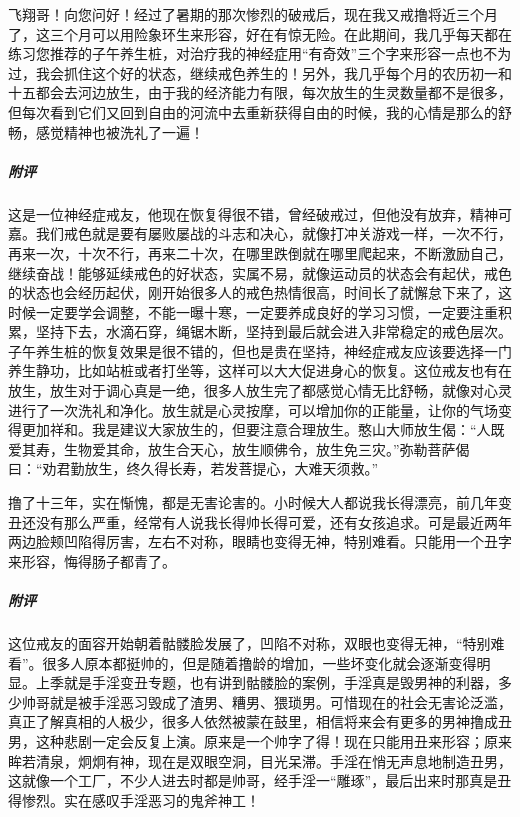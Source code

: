 \begin{case}
    飞翔哥！向您问好！经过了暑期的那次惨烈的破戒后，现在我又戒撸将近三个月了，这三个月可以用险象环生来形容，好在有惊无险。在此期间，我几乎每天都在练习您推荐的子午养生桩，对治疗我的神经症用“有奇效”三个字来形容一点也不为过，我会抓住这个好的状态，继续戒色养生的！另外，我几乎每个月的农历初一和十五都会去河边放生，由于我的经济能力有限，每次放生的生灵数量都不是很多，但每次看到它们又回到自由的河流中去重新获得自由的时候，我的心情是那么的舒畅，感觉精神也被洗礼了一遍！
    \subparagraph{附评} 这是一位神经症戒友，他现在恢复得很不错，曾经破戒过，但他没有放弃，精神可嘉。我们戒色就是要有屡败屡战的斗志和决心，就像打冲关游戏一样，一次不行，再来一次，十次不行，再来二十次，在哪里跌倒就在哪里爬起来，不断激励自己，继续奋战！能够延续戒色的好状态，实属不易，就像运动员的状态会有起伏，戒色的状态也会经历起伏，刚开始很多人的戒色热情很高，时间长了就懈怠下来了，这时候一定要学会调整，不能一曝十寒，一定要养成良好的学习习惯，一定要注重积累，坚持下去，水滴石穿，绳锯木断，坚持到最后就会进入非常稳定的戒色层次。子午养生桩的恢复效果是很不错的，但也是贵在坚持，神经症戒友应该要选择一门养生静功，比如站桩或者打坐等，这样可以大大促进身心的恢复。这位戒友也有在放生，放生对于调心真是一绝，很多人放生完了都感觉心情无比舒畅，就像对心灵进行了一次洗礼和净化。放生就是心灵按摩，可以增加你的正能量，让你的气场变得更加祥和。我是建议大家放生的，但要注意合理放生。憨山大师放生偈：“人既爱其寿，生物爱其命，放生合天心，放生顺佛令，放生免三灾。”弥勒菩萨偈曰：“劝君勤放生，终久得长寿，若发菩提心，大难天须救。”
\end{case}

\begin{case}
    撸了十三年，实在惭愧，都是无害论害的。小时候大人都说我长得漂亮，前几年变丑还没有那么严重，经常有人说我长得帅长得可爱，还有女孩追求。可是最近两年两边脸颊凹陷得厉害，左右不对称，眼睛也变得无神，特别难看。只能用一个丑字来形容，悔得肠子都青了。
    \subparagraph{附评} 这位戒友的面容开始朝着骷髅脸发展了，凹陷不对称，双眼也变得无神，“特别难看”。很多人原本都挺帅的，但是随着撸龄的增加，一些坏变化就会逐渐变得明显。上季就是手淫变丑专题，也有讲到骷髅脸的案例，手淫真是毁男神的利器，多少帅哥就是被手淫恶习毁成了渣男、糟男、猥琐男。可惜现在的社会无害论泛滥，真正了解真相的人极少，很多人依然被蒙在鼓里，相信将来会有更多的男神撸成丑男，这种悲剧一定会反复上演。原来是一个帅字了得！现在只能用丑来形容；原来眸若清泉，炯炯有神，现在是双眼空洞，目光呆滞。手淫在悄无声息地制造丑男，这就像一个工厂，不少人进去时都是帅哥，经手淫一“雕琢”，最后出来时那真是丑得惨烈。实在感叹手淫恶习的鬼斧神工！
\end{case}

